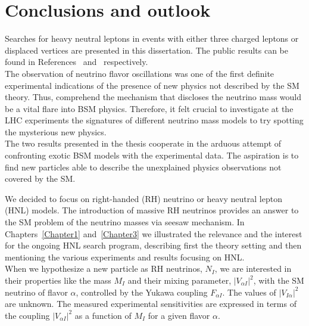 
\chapter{Conclusions and outlook}\label{Chapter7} 

Searches for heavy neutral leptons in events with either three
charged leptons or displaced vertices are presented in this dissertation. The public
results can be found in References~\cite{Sirunyan:2018mtv} and~\cite{CMS-PAS-EXO-20-009} respectively.\\


The observation of neutrino flavor oscillations was one of the first 
definite experimental indications of the
presence of new physics not described by the SM theory. Thus, 
comprehend the mechanism that discloses the neutrino mass would be a
vital flare into BSM physics. Therefore, it felt crucial to investigate at the LHC
experiments the signatures of different neutrino mass models
to try spotting the mysterious new physics.\\
The two results presented in the thesis cooperate in the arduous attempt of confronting exotic BSM
models with the experimental data. The aspiration is to find new
particles able to describe the unexplained
physics observations not covered by the SM. 

We decided to focus on right-handed (RH) neutrino or heavy neutral lepton (HNL)
models. The introduction of massive RH
neutrinos provides an answer to the SM problem of the
neutrino masses via seesaw mechanism.  
In Chapters~\ref{Chapter1} and~\ref{Chapter3} we illustrated
the relevance and the interest for the
ongoing HNL search program, describing first the theory setting 
and then mentioning the various experiments and results
focusing on HNL.\\
When we hypothesize a new particle as RH neutrinos, $N_{I}$, we
are interested in their properties like the mass $M_I$ and
their mixing parameter, $|V_{\alpha I}|^2$,  with the SM neutrino of flavor $\alpha$,
controlled by the Yukawa coupling $F_{\alpha I}$. The values of $|V_{I
  \alpha}|^2$ are unknown. The measured experimental
sensitivities are expressed in
terms of the coupling $|V_{\alpha I}|^2$
as a function of $M_I$ for a given flavor $\alpha$. 


